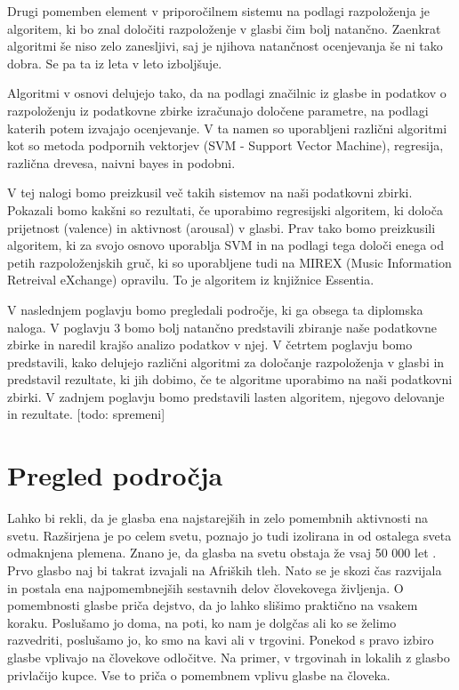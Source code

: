 \documentclass[a4paper, 12pt]{book}
\begin{document}
{Drugi pomemben element v priporočilnem sistemu na podlagi razpoloženja je algoritem, ki bo znal določiti razpoloženje v glasbi čim bolj natančno. Zaenkrat algoritmi še niso zelo zanesljivi, saj je njihova natančnost ocenjevanja še ni tako dobra. Se pa ta iz leta v leto izboljšuje. 

Algoritmi v osnovi delujejo tako, da na podlagi značilnic iz glasbe in podatkov o razpoloženju iz podatkovne zbirke izračunajo določene parametre, na podlagi katerih potem izvajajo ocenjevanje. V ta namen so uporabljeni različni algoritmi kot so metoda podpornih vektorjev (SVM - Support Vector Machine), regresija, različna drevesa, naivni bayes in podobni. 

V tej nalogi bomo preizkusil več takih sistemov na naši podatkovni zbirki. Pokazali bomo kakšni so rezultati, če uporabimo regresijski algoritem, ki določa prijetnost (valence) in aktivnost (arousal) v glasbi. Prav tako bomo preizkusili algoritem, ki za svojo osnovo uporablja SVM in na podlagi tega določi enega od petih razpoloženjskih gruč, ki so uporabljene tudi na MIREX (Music Information Retreival eXchange) opravilu. To je algoritem iz knjižnice Essentia.

V naslednjem poglavju bomo pregledali področje, ki ga obsega ta diplomska naloga. V poglavju 3 bomo bolj natančno predstavili zbiranje naše podatkovne zbirke in naredil krajšo analizo podatkov v njej. V četrtem poglavju bomo predstavili, kako delujejo različni algoritmi za določanje razpoloženja v glasbi in predstavil rezultate, ki jih dobimo, če te algoritme uporabimo na naši podatkovni zbirki. V zadnjem poglavju bomo predstavili lasten algoritem, njegovo delovanje in rezultate. [todo: spremeni]

\chapter{Pregled področja}

Lahko bi rekli, da je glasba ena najstarejših in zelo pomembnih aktivnosti na svetu. Razširjena je po celem svetu, poznajo jo tudi izolirana in od ostalega sveta odmaknjena plemena. Znano je, da glasba na svetu obstaja že vsaj 50 000 let \cite{Krause2012}. Prvo glasbo naj bi takrat izvajali na Afriških tleh. Nato se je skozi čas razvijala in postala ena najpomembnejših sestavnih delov človekovega življenja. O pomembnosti glasbe priča dejstvo, da jo lahko slišimo praktično na vsakem koraku. Poslušamo jo doma, na poti, ko nam je dolgčas ali ko se želimo razvedriti, poslušamo jo, ko smo na kavi ali v trgovini. Ponekod s pravo izbiro glasbe vplivajo na človekove odločitve. Na primer, v trgovinah in lokalih z glasbo privlačijo kupce. Vse to priča o pomembnem vplivu glasbe na človeka.  

}
\end{document}
